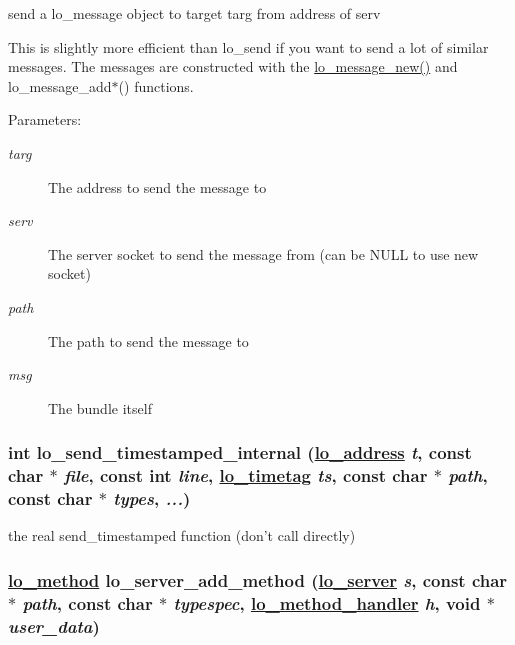 send a lo\_\-message object to target targ from address of serv 

This is slightly more efficient than lo\_\-send if you want to send a lot of similar messages. The messages are constructed with the \hyperlink{group__liblolowlevel_g2cce2e97452e3e9d6b5d3af33bb1d153}{lo\_\-message\_\-new()} and lo\_\-message\_\-add$\ast$() functions.

\begin{Desc}
\item[Parameters:]
\begin{description}
\item[{\em targ}]The address to send the message to \item[{\em serv}]The server socket to send the message from (can be NULL to use new socket) \item[{\em path}]The path to send the message to \item[{\em msg}]The bundle itself \end{description}
\end{Desc}
\hypertarget{group__liblolowlevel_gdeddaa8c418eec4600ef1f3099d24f42}{
\subsubsection[lo\_\-send\_\-timestamped\_\-internal]{\setlength{\rightskip}{0pt plus 5cm}int lo\_\-send\_\-timestamped\_\-internal (\hyperlink{lo__types_8h_bf9b53223467de596b89e1377b0f3f3d}{lo\_\-address} {\em t}, const char $\ast$ {\em file}, const int {\em line}, \hyperlink{structlo__timetag}{lo\_\-timetag} {\em ts}, const char $\ast$ {\em path}, const char $\ast$ {\em types},  {\em ...})}}
\label{group__liblolowlevel_gdeddaa8c418eec4600ef1f3099d24f42}


the real send\_\-timestamped function (don't call directly) 

\hypertarget{group__liblolowlevel_g0c183cabaac67eb9aad3265ae1efa580}{
\subsubsection[lo\_\-server\_\-add\_\-method]{\setlength{\rightskip}{0pt plus 5cm}\hyperlink{lo__types_8h_66faedf5da13231d8c0166870477dce5}{lo\_\-method} lo\_\-server\_\-add\_\-method (\hyperlink{lo__types_8h_59067bf50cf8abb4371da6f03c9036c9}{lo\_\-server} {\em s}, const char $\ast$ {\em path}, const char $\ast$ {\em typespec}, \hyperlink{lo__types_8h_4551cfeeee8917dea22bf1c7e858fd2b}{lo\_\-method\_\-handler} {\em h}, void $\ast$ {\em user\_\-data})}}
\label{group__liblolowlevel_g0c183cabaac67eb9aad3265ae1efa580}


